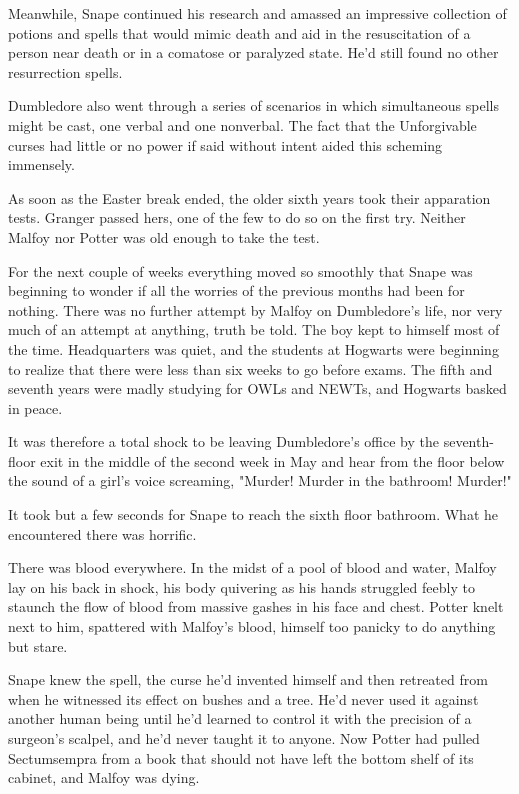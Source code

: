 Meanwhile, Snape continued his research and amassed an impressive collection of potions and spells that would mimic death and aid in the resuscitation of a person near death or in a comatose or paralyzed state. He'd still found no other resurrection spells.

Dumbledore also went through a series of scenarios in which simultaneous spells might be cast, one verbal and one nonverbal. The fact that the Unforgivable curses had little or no power if said without intent aided this scheming immensely.

As soon as the Easter break ended, the older sixth years took their apparation tests. Granger passed hers, one of the few to do so on the first try. Neither Malfoy nor Potter was old enough to take the test.

For the next couple of weeks everything moved so smoothly that Snape was beginning to wonder if all the worries of the previous months had been for nothing. There was no further attempt by Malfoy on Dumbledore's life, nor very much of an attempt at anything, truth be told. The boy kept to himself most of the time. Headquarters was quiet, and the students at Hogwarts were beginning to realize that there were less than six weeks to go before exams. The fifth and seventh years were madly studying for OWLs and NEWTs, and Hogwarts basked in peace.

It was therefore a total shock to be leaving Dumbledore's office by the seventh-floor exit in the middle of the second week in May and hear from the floor below the sound of a girl's voice screaming, "Murder! Murder in the bathroom! Murder!"

It took but a few seconds for Snape to reach the sixth floor bathroom. What he encountered there was horrific.

There was blood everywhere. In the midst of a pool of blood and water, Malfoy lay on his back in shock, his body quivering as his hands struggled feebly to staunch the flow of blood from massive gashes in his face and chest. Potter knelt next to him, spattered with Malfoy's blood, himself too panicky to do anything but stare.

Snape knew the spell, the curse he'd invented himself and then retreated from when he witnessed its effect on bushes and a tree. He'd never used it against another human being until he'd learned to control it with the precision of a surgeon's scalpel, and he'd never taught it to anyone. Now Potter had pulled Sectumsempra from a book that should not have left the bottom shelf of its cabinet, and Malfoy was dying.

